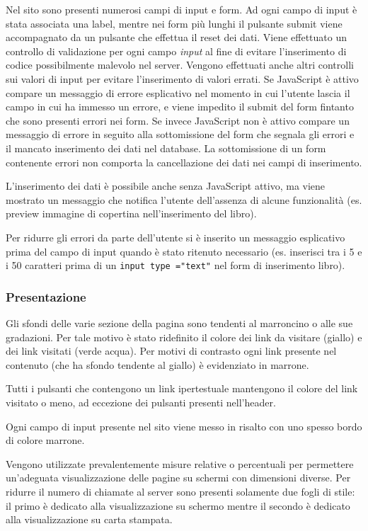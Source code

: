 \documentclass[12pt,a4paper,headings=optiontohead]{article}
\begin{document}
Nel sito sono presenti numerosi campi di input e form. Ad ogni campo di input è stata associata una label, mentre nei form più lunghi il pulsante submit viene accompagnato da un pulsante che effettua il reset dei dati. Viene effettuato un controllo di validazione per ogni campo \textit{input} al fine di evitare l'inserimento di codice possibilmente malevolo nel server. 
Vengono effettuati anche altri controlli sui valori di input per evitare l'inserimento di valori errati. Se JavaScript è attivo compare un messaggio di errore esplicativo nel momento in cui l'utente lascia il campo in cui ha immesso un errore, e viene impedito il submit del form fintanto che sono presenti errori nei form. Se invece JavaScript non è attivo compare un messaggio di errore in seguito alla sottomissione del form che segnala gli errori e il mancato inserimento dei dati nel database. La sottomissione di un form contenente errori non comporta la cancellazione dei dati nei campi di inserimento.

L'inserimento dei dati è possibile anche senza JavaScript attivo, ma viene mostrato un messaggio che notifica l'utente dell'assenza di alcune funzionalità (es. preview immagine di copertina nell'inserimento del libro).

Per ridurre gli errori da parte dell'utente si è inserito un messaggio esplicativo prima del campo di input quando è stato ritenuto necessario (es. inserisci tra i 5 e i 50 caratteri prima di un \texttt{input type ="text"} nel form di inserimento libro). 

\subsubsection{Presentazione}
Gli sfondi delle varie sezione della pagina sono tendenti al marroncino o alle sue gradazioni. Per tale motivo è stato ridefinito il colore dei link da visitare (giallo) e dei link visitati (verde acqua). Per motivi di contrasto ogni link presente nel contenuto (che ha sfondo tendente al giallo) è evidenziato in marrone.

Tutti i pulsanti che contengono un link ipertestuale mantengono il colore del link visitato o meno, ad eccezione dei pulsanti presenti nell'header.

Ogni campo di input presente nel sito viene messo in risalto con uno spesso bordo di colore marrone.

Vengono utilizzate prevalentemente misure relative o percentuali per permettere un'adeguata visualizzazione delle pagine su schermi con dimensioni diverse.
Per ridurre il numero di chiamate al server sono presenti solamente due fogli di stile: il primo è dedicato alla visualizzazione su schermo mentre il secondo è dedicato alla visualizzazione su carta stampata.
\end{document}
